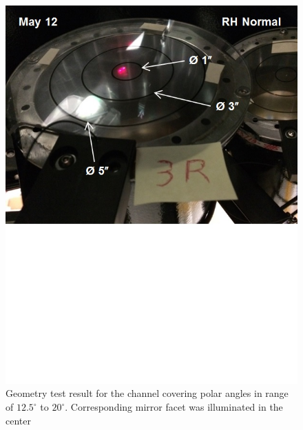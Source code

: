 \begin{figure}[h]
    \centering
    \includegraphics[width=1.0\linewidth,trim={0 8.5cm 0 0},clip]{images/GEO_TEST_3_Normal.jpg}
    \caption{Geometry test result for the channel covering polar angles in range of $12.5^\circ$ to $20^\circ$. Corresponding mirror facet was illuminated in the center}
    \label{fig:GEO_TEST_3_Normal}
\end{figure}

